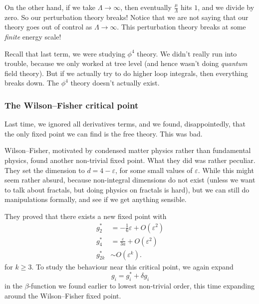 \documentclass[a4paper]{article}
\begin{document}
On the other hand, if we take $\Lambda \to \infty$, then eventually $\frac{\mu}{\Lambda}$ hits $1$, and we divide by zero. So our perturbation theory breaks! Notice that we are not saying that our theory goes out of control as $\Lambda \to \infty$. This perturbation theory breaks at some \emph{finite} energy scale!

Recall that last term, we were studying $\phi^4$ theory. We didn't really run into trouble, because we only worked at tree level (and hence wasn't doing \emph{quantum} field theory). But if we actually try to do higher loop integrals, then everything breaks down. The $\phi^4$ theory doesn't actually exist.

\subsubsection*{The Wilson--Fisher critical point}
Last time, we ignored all derivatives terms, and we found, disappointedly, that the only fixed point we can find is the free theory. This was bad.

Wilson--Fisher, motivated by condensed matter physics rather than fundamental physics, found another non-trivial fixed point. What they did was rather peculiar. They set the dimension to $d = 4 - \varepsilon$, for some small values of $\varepsilon$. While this might seem rather absurd, because non-integral dimensions do not exist (unless we want to talk about fractals, but doing physics on fractals is hard), but we can still do manipulations formally, and see if we get anything sensible.

They proved that there exists a new fixed point with
\begin{align*}
  g_2^* &= -\frac{1}{6} \varepsilon + O(\varepsilon^2)\\
  g_4^* &= \frac{\varepsilon}{3a} + O(\varepsilon^2)\\
  g_{2k}^* &\sim O(\varepsilon^k).
\end{align*}
for $k \geq 3$. To study the behaviour near this critical point, we again expand
\[
  g_i = g_i^* + \delta g_i
\]
in the $\beta$-function we found earlier to lowest non-trivial order, this time expanding around the Wilson--Fisher fixed point.
\end{document}
